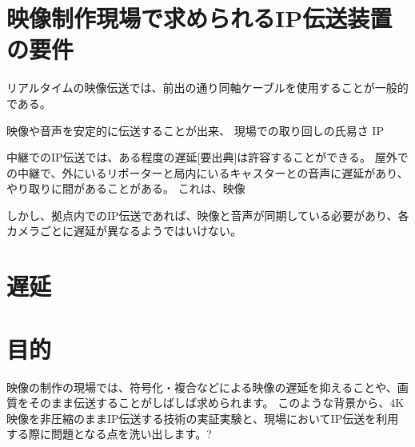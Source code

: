 \section{映像制作現場で求められるIP伝送装置の要件}

リアルタイムの映像伝送では、前出の通り同軸ケーブルを使用することが一般的である。

映像や音声を安定的に伝送することが出来、
現場での取り回しの氏易さ
IP

中継でのIP伝送では、ある程度の遅延[要出典]は許容することができる。
屋外での中継で、外にいるリポーターと局内にいるキャスターとの音声に遅延があり、やり取りに間があることがある。
これは、映像

しかし、拠点内でのIP伝送であれば、映像と音声が同期している必要があり、各カメラごとに遅延が異なるようではいけない。

\section{遅延}

\section{目的}

映像の制作の現場では、符号化・複合などによる映像の遅延を抑えることや、画質をそのまま伝送することがしばしば求められます。
このような背景から、4K映像を非圧縮のままIP伝送する技術の実証実験と、現場においてIP伝送を利用する際に問題となる点を洗い出します。?

